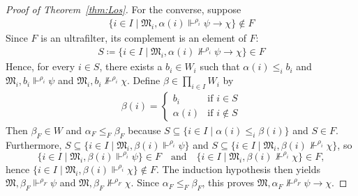 \documentclass[submission,copyright,creativecommons]{eptcs}
\newcommand{\mo}{\mathfrak}
\newcommand{\satisfySym}{\Vdash}
\newcommand{\satisfy}[4]{#1, #2 \satisfySym^{#4} #3}
\newcommand{\notsatisfy}[4]{#1, #2 \not\Vdash^{#4} #3}
\begin{document}
\begin{proof}[Proof of Theorem~\ref{thm:Los}]
    For the converse, suppose 
    \begin{align*}
      \{ i \in I \mid \satisfy{\mo{M}_i}{\alpha(i)}{\psi\to\chi}{\rho_i} \} \notin F
    \end{align*}
    Since $F$ is an ultrafilter, its complement is an element of $F$:
    \begin{align*}
      S \coloneq \{ i \in I \mid \notsatisfy{\mo{M}_i}{\alpha(i)}{\psi\to\chi}{\rho_i} \} \in F
    \end{align*}
    Hence, for every $i \in S$, there exists a $b_i \in W_i$ such that
    $\alpha(i) \leq_i b_i$ and $\satisfy{\mo{M}_i}{b_i}{\psi}{\rho_i}$
    and $\notsatisfy{\mo{M}_i}{b_i}{\chi}{\rho_i}$.
    Define $\beta \in \prod_{i \in I} W_i$ by
    \begin{align*}
      \beta(i)
        = \begin{cases}
            b_i &\text{if } i \in S \\
            \alpha(i) &\text{if } i \notin S
          \end{cases}
    \end{align*}
    Then $\beta_F \in W$ and $\alpha_F \leq_F \beta_F$
    because $S \subseteq \{ i \in I \mid \alpha(i) \leq_i \beta(i) \}$ and $S \in F$.
    Furthermore,
    $S \subseteq \{ i \in I \mid \satisfy{\mo{M}_i}{\beta(i)}{\psi}{\rho_i} \}$
    and $S \subseteq \{ i \in I \mid \notsatisfy{\mo{M}_i}{\beta(i)}{\chi}{\rho_i} \}$, 
    so
    \begin{equation*}
      \{ i \in I \mid \satisfy{\mo{M}_i}{\beta(i)}{\psi}{\rho_i} \} \in F
      \quad\text{and}\quad
      \{ i \in I \mid \notsatisfy{\mo{M}_i}{\beta(i)}{\chi}{\rho_i} \} \in F,
    \end{equation*}
    hence $\{ i \in I \mid \satisfy{\mo{M}_i}{\beta(i)}{\chi}{\rho_i} \} \notin F$.
    The induction hypothesis then yields $\satisfy{\mo{M}}{\beta_F}{\psi}{\rho_F}$
    and $\notsatisfy{\mo{M}}{\beta_F}{\chi}{\rho_F}$.
    Since $\alpha_F \leq_F \beta_F$, this proves
    $\notsatisfy{\mo{M}}{\alpha_F}{\psi\to\chi}{\rho_F}$.


\end{proof}
\end{document}
